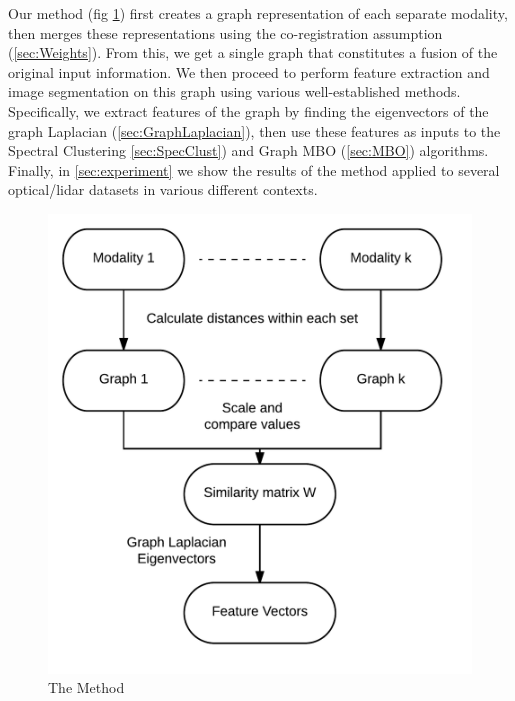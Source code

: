 \documentclass[journal]{IEEEtran}
\begin{document}
Our method (fig \ref{fig:flowchart}) first creates a graph representation of
each separate modality, then merges these representations using the
co-registration assumption (\ref{sec:Weights}). From this, we get a single graph
that constitutes a fusion of the original input information. We then proceed to
perform feature extraction and image segmentation on this graph using various
well-established methods. Specifically, we extract features of the graph by
finding the eigenvectors of the graph Laplacian (\ref{sec:GraphLaplacian}), then
use these features as inputs to the Spectral Clustering \ref{sec:SpecClust}) and
Graph MBO (\ref{sec:MBO}) algorithms. Finally, in \ref{sec:experiment} we show
the results of the method applied to several optical/lidar datasets in various
different contexts.

\begin{figure}
  \includegraphics[width=\columnwidth]{./Images/flowchart.png}
  \caption{The Method}
  \label{fig:flowchart}
\end{figure}
\end{document}
